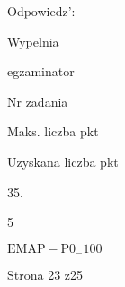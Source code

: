 \documentclass[a4paper,12pt]{article}
\begin{document}
Odpowiedz':

Wypelnia

egzaminator

Nr zadania

Maks. liczba pkt

Uzyskana liczba pkt

35.

5

$\mathrm{E}\mathrm{M}\mathrm{A}\mathrm{P}-\mathrm{P}0_{-}100$

Strona 23 z25
\end{document}
